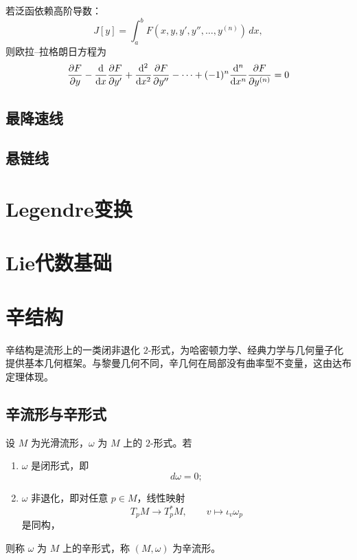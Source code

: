 若泛函依赖高阶导数：
\begin{equation}
    J[y]=\int_a^b F(x,y,y',y'',\dots,y^{(n)})\,dx,
\end{equation}
则欧拉–拉格朗日方程为
\begin{equation}
    \frac{\partial F}{\partial y}
-\frac{\mathrm{d}}{\mathrm{d} x}\frac{\partial F}{\partial y'}
+\frac{\mathrm{d}^2}{\mathrm{d} x^2}\frac{\partial F}{\partial y''}
-\cdots
+(-1)^n\frac{\mathrm{d}^n}{\mathrm{d} x^n}\frac{\partial F}{\partial y^{(n)}}=0
\end{equation}

\section{最降速线}

\section{悬链线}

\chapter{Legendre变换}
\label{sec:legendre}
\chapter{Lie代数基础}
\label{sec:lie}


\chapter{辛结构}
\label{sec:sympletic}

辛结构是流形上的一类闭非退化 \(2\)-形式，为哈密顿力学、经典力学与几何量子化提供基本几何框架。与黎曼几何不同，辛几何在局部没有曲率型不变量，这由达布定理体现。

\section{辛流形与辛形式}

\begin{definition}[辛流形]
设 \(M\) 为光滑流形，\(\omega\) 为 \(M\) 上的 \(2\)-形式。若
\begin{enumerate}
  \item \(\omega\) 是闭形式，即
  \[
  d\omega=0;
  \]
  \item \(\omega\) 非退化，即对任意 \(p\in M\)，线性映射
  \[
  T_pM\to T_p^*M,\qquad v\mapsto \iota_v\omega_p
  \]
  是同构，
\end{enumerate}
则称 \(\omega\) 为 \(M\) 上的辛形式，称 \((M,\omega)\) 为辛流形。
\end{definition}

